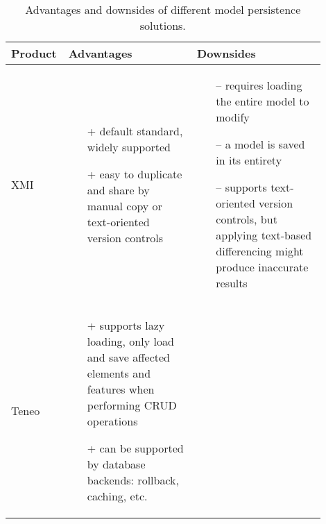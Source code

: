 \begin{table*}[]
  \centering
  \caption{Advantages and downsides of different model persistence solutions.}
  \label{table:model_persistence_comparison}
  \begin{scriptsize}
    \begin{tabular}{
        |>{\centering\arraybackslash}m{0.1\linewidth}
        |>{\centering\arraybackslash}m{0.4\linewidth}
        |>{\centering\arraybackslash}m{0.4\linewidth}
        |}
      \hline
      \textbf{Product} & \textbf{Advantages} & \textbf{Downsides} \\
      \hline
      XMI
      &
      \begin{minipage}[t]{\linewidth}
        \raggedright
        \begin{itemize}[leftmargin=7pt]
          \setlength
          \item[+] default standard, widely supported
          \item[+] easy to duplicate and share by manual copy or text-oriented version controls
          \item[]
        \end{itemize}
      \end{minipage}
      &
      \begin{minipage}[t]{\linewidth}
        \raggedright
        \begin{itemize}[leftmargin=5pt]
          \setlength
          \item[--] requires loading the entire model to modify
          \item[--] a model is saved in its entirety
          \item[--] supports text-oriented version controls, but applying text-based differencing might produce inaccurate results
          \item[]
        \end{itemize}
      \end{minipage}
      \\
      \hline
      Teneo
      &
      \begin{minipage}[t]{\linewidth}
        \raggedright
        \begin{itemize}[leftmargin=7pt]
          \setlength
          \item[+] supports lazy loading, only load and save affected elements and features when performing CRUD operations
          \item[+] can be supported by database backends: rollback, caching, etc.
          \item[]

\end{itemize}
\end{minipage}
\end{tabular}
\end{scriptsize}
\end{table*}
